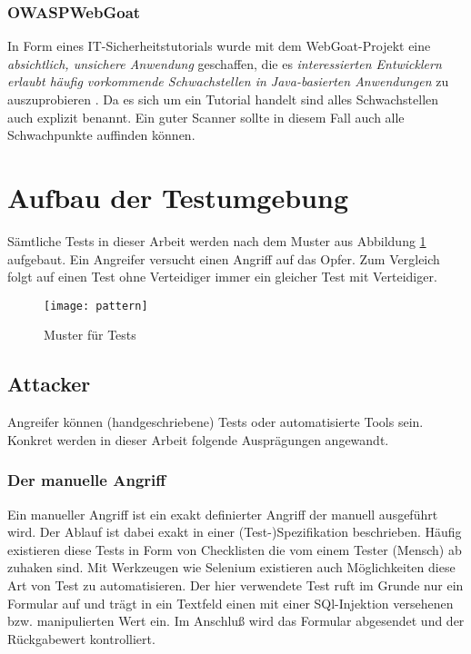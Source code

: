 \subsubsection{OWASP\textregistered WebGoat}

In Form eines IT-Sicherheitstutorials wurde mit dem WebGoat-Projekt eine \emph{absichtlich, unsichere Anwendung} geschaffen, die es \emph{interessierten Entwicklern erlaubt häufig vorkommende Schwachstellen in Java-basierten Anwendungen} zu auszuprobieren \cite{owaspgoat}. Da es sich um ein Tutorial handelt sind alles Schwachstellen auch explizit benannt. Ein guter Scanner sollte in diesem Fall auch alle Schwachpunkte auffinden können. 


\section{Aufbau der Testumgebung}

Sämtliche Tests in dieser Arbeit werden nach dem Muster aus Abbildung \ref{fig.pattern} aufgebaut. Ein \glqq Angreifer\grqq{} versucht einen Angriff auf das \glqq Opfer\grqq. Zum Vergleich folgt auf einen Test ohne \glqq Verteidiger\grqq{} immer ein gleicher Test mit Verteidiger.

\begin{figure}[bht]
  \begin{center}
    \texttt{[image: pattern]}
    \caption{Muster für Tests}
    \label{fig.pattern}
  \end{center}
\end{figure}

\subsection{Attacker}
Angreifer können (handgeschriebene) Tests oder automatisierte Tools sein. Konkret werden in dieser Arbeit folgende Ausprägungen angewandt.

\subsubsection{Der manuelle Angriff}

Ein manueller Angriff ist ein exakt definierter Angriff der manuell ausgeführt wird. Der Ablauf ist dabei exakt in einer (Test-)Spezifikation beschrieben. Häufig existieren diese Tests in Form von Checklisten die vom einem Tester (Mensch) ab zuhaken sind. Mit Werkzeugen wie Selenium existieren auch Möglichkeiten diese Art von Test zu automatisieren. Der hier verwendete Test ruft im Grunde nur ein Formular auf und trägt in ein Textfeld einen mit einer SQl-Injektion versehenen bzw. manipulierten Wert ein. Im Anschluß wird das Formular abgesendet und der Rückgabewert kontrolliert.\\

